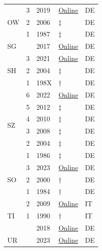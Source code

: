 {\begin{minipage}[t]{0.49\textwidth}
\begin{longtable}{|p{1cm}|p{1cm}|p{1.5cm}|p{1.5cm}|p{1cm}|}
\multirow{3}{*}{OW} & 3 & 2019 & \href{https://www.ow.ch/_docn/319351/Ripla_2019_Text_Stand_Fortschreibung_Nov_2022.pdf}{Online} & DE \\
 & 2 & 2006 & ‡ & DE \\
 & 1 & 1987 & ‡ & DE \\ \hline

\multirow{1}{*}{SG} &  & 2017 & \href{https://www.sg.ch/bauen/raumentwicklung/kantonaleplanung/richtplanung/_jcr_content/Par/sgch_downloadlist_1942323361/DownloadListPar/sgch_download.ocFile/Richtplantext_Stand_Dezember_2024.pdf}{Online} & DE \\ \hline

\multirow{3}{*}{SH} & 3 & 2021 & \href{https://sh.ch/CMS/get/file/57143567-acad-4331-a47a-a7fda8114f37}{Online} & DE \\
 & 2 & 2004 & ‡ & DE \\
 & 1 & 198X & † & DE \\ \hline

\multirow{6}{*}{SZ} & 6 & 2022 & \href{https://www.sz.ch/public/upload/assets/68888/Richtplan_des_Kantons_Schwyz_Richtplantext.pdf?fp=8}{Online} & DE \\
 & 5 & 2012 & ‡ & DE \\
 & 4 & 2010 & ‡ & DE \\
 & 3 & 2008 & ‡ & DE \\
 & 2 & 2004 & ‡ & DE \\
 & 1 & 1986 & ‡ & DE \\ \hline

\multirow{3}{*}{SO} & 3 & 2023 & \href{https://so.ch/verwaltung/bau-und-justizdepartement/amt-fuer-raumplanung/richtplanung/}{Online} & DE \\
 & 2 & 2000 & † & DE \\
 & 1 & 1984 & † & DE \\ \hline

\multirow{3}{*}{TI} & 2 & 2009 & \href{https://www4.ti.ch/fileadmin/DT/temi/piano_direttore/rapporto_esplicativo/00_Rapporto_completo.pdf}{Online} & IT \\
 & 1 & 1990 & † & IT \\ \hline

\multirow{1}{*}{TG} &  & 2018 & \href{https://raumentwicklung.tg.ch/public/upload/assets/160825/TG_Kantonaler_Richtplan_komplett_rechtskraeftig.pdf?fp=4}{Online} & DE \\ \hline

\multirow{1}{*}{UR} &  & 2023 & \href{https://www.ur.ch/_docn/375874/Richtplantext_240122.pdf}{Online} & DE \\ \hline


\end{longtable}
\end{minipage}}
